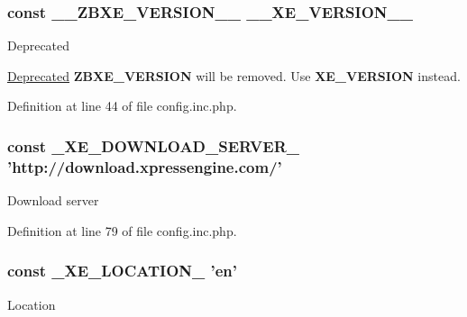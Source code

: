 \hypertarget{config_8inc_8php_a0e70c145bf3712e075af5c3861045dc9}{
\subsubsection[{\-\_\-\-\_\-\-Z\-B\-X\-E\-\_\-\-V\-E\-R\-S\-I\-O\-N\-\_\-\-\_\-}]{\setlength{\rightskip}{0pt plus 5cm}const \-\_\-\-\_\-\-Z\-B\-X\-E\-\_\-\-V\-E\-R\-S\-I\-O\-N\-\_\-\-\_\- {\bf \-\_\-\-\_\-\-X\-E\-\_\-\-V\-E\-R\-S\-I\-O\-N\-\_\-\-\_\-}}}\label{config_8inc_8php_a0e70c145bf3712e075af5c3861045dc9}
\begin{DoxyRefDesc}{Deprecated}
\item[\hyperlink{deprecated__deprecated000012}{Deprecated}]{\bfseries Z\-B\-X\-E\-\_\-\-V\-E\-R\-S\-I\-O\-N} will be removed. Use {\bfseries X\-E\-\_\-\-V\-E\-R\-S\-I\-O\-N} instead. \end{DoxyRefDesc}


Definition at line 44 of file config.\-inc.\-php.

\hypertarget{config_8inc_8php_a22df32d3e0eae0d60d6cddb9ec99d5ec}{
\subsubsection[{\-\_\-\-X\-E\-\_\-\-D\-O\-W\-N\-L\-O\-A\-D\-\_\-\-S\-E\-R\-V\-E\-R\-\_\-}]{\setlength{\rightskip}{0pt plus 5cm}const \-\_\-\-X\-E\-\_\-\-D\-O\-W\-N\-L\-O\-A\-D\-\_\-\-S\-E\-R\-V\-E\-R\-\_\- 'http\-://download.\-xpressengine.\-com/'}}\label{config_8inc_8php_a22df32d3e0eae0d60d6cddb9ec99d5ec}
Download server 

Definition at line 79 of file config.\-inc.\-php.

\hypertarget{config_8inc_8php_a7330debbfb3a027cdd5f3d3dd1dfbdd0}{
\subsubsection[{\-\_\-\-X\-E\-\_\-\-L\-O\-C\-A\-T\-I\-O\-N\-\_\-}]{\setlength{\rightskip}{0pt plus 5cm}const \-\_\-\-X\-E\-\_\-\-L\-O\-C\-A\-T\-I\-O\-N\-\_\- 'en'}}\label{config_8inc_8php_a7330debbfb3a027cdd5f3d3dd1dfbdd0}
Location 

